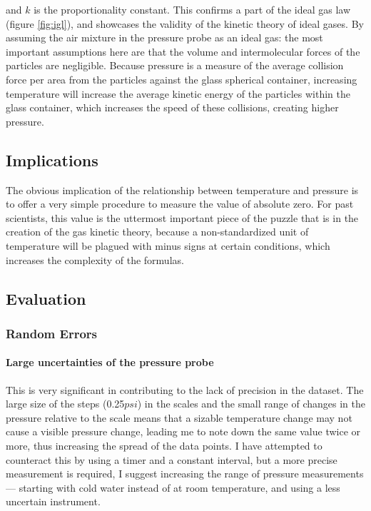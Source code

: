 \documentclass[a4paper,12pt]{article}
\begin{document}
and $k$ is the proportionality constant. This confirms a part of the ideal gas law (figure \ref{fig:igl}), and showcases the validity of the kinetic theory of ideal gases.
%
By assuming the air mixture in the pressure probe as an ideal gas: the most important assumptions here are that the volume and intermolecular forces of the particles are negligible. Because pressure is a measure of the average collision force per area from the particles against the glass spherical container, increasing temperature will increase the average kinetic energy of the particles within the glass container, which increases the speed of these collisions, creating higher pressure.

\subsection{Implications}
The obvious implication of the relationship between temperature and pressure is to offer a very simple procedure to measure the value of absolute zero. For past scientists, this value is the uttermost important piece of the puzzle that is in the creation of the gas kinetic theory, because a non-standardized unit of temperature will be plagued with minus signs at certain conditions, which increases the complexity of the formulas.

\subsection{Evaluation}


\subsubsection{Random Errors}
\paragraph{Large uncertainties of the pressure probe} This is very significant in contributing to the lack of precision in the dataset. The large size of the steps (0.25$\si{psi}$) in the scales and the small range of changes in the pressure relative to the scale means that a sizable temperature change may not cause a visible pressure change, leading me to note down the same value twice or more, thus increasing the spread of the data points. I have attempted to counteract this by using a timer and a constant interval, but a more precise measurement is required, I suggest increasing the range of pressure measurements --- starting with cold water instead of at room temperature, and using a less uncertain instrument.
\end{document}
